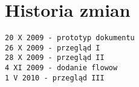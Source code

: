 \documentclass[12pt,a4paper,twoside]{article}
\begin{document}






\section{Historia zmian}

\begin{verbatim}
20 X 2009 - prototyp dokumentu
26 X 2009 - przegląd I
28 X 2009 - przegląd II
4 XI 2009 - dodanie flowow
1 V 2010 - przegląd III
\end{verbatim}
\end{document}
